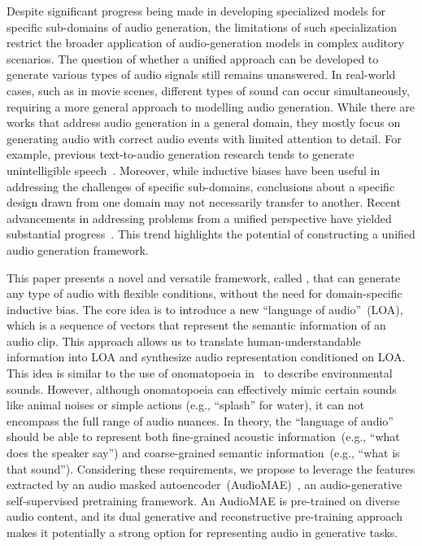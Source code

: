 \documentclass[lettersize,journal]{IEEEtran}
\begin{document}
Despite significant progress being made in developing specialized models for specific sub-domains of audio generation, the limitations of such specialization restrict the broader application of audio-generation models in complex auditory scenarios.
The question of whether a unified approach can be developed to generate various types of audio signals still remains unanswered.
In real-world cases, such as in movie scenes, different types of sound can occur simultaneously, requiring a more general approach to modelling audio generation. 
While there are works that address audio generation in a general domain, they mostly focus on generating  audio with correct audio events with limited attention to detail. For example, previous text-to-audio generation research tends to generate unintelligible speech~\cite{yang2022diffsound,liu2023audioldm,huang2023make-an-audio}.
Moreover, while inductive biases have been useful in addressing the challenges of specific sub-domains, conclusions about a specific design drawn from one domain may not necessarily transfer to another. 
Recent advancements in addressing problems from a unified perspective have yielded substantial progress~\cite{liu2021voicefixer, baevski2022data2vec, girdhar2023imagebind, kong2023universal}. This trend highlights the potential of constructing a unified audio generation framework.

This paper presents a novel and versatile framework, called \vModelName, that can generate any type of audio with flexible conditions, without the need for domain-specific inductive bias. The core idea is to introduce a new ``language of audio''~(LOA), which is a sequence of vectors that represent the semantic information of an audio clip. 
This approach allows us to translate human-understandable information into LOA and synthesize audio representation conditioned on LOA. This idea is similar to the use of onomatopoeia in~\cite{okamoto2022onoma} to describe environmental sounds. However, although onomatopoeia can effectively mimic certain sounds like animal noises or simple actions (e.g., ``splash'' for water), it can not encompass the full range of audio nuances. 
In theory, the ``language of audio'' should be able to represent both fine-grained acoustic information~(e.g., ``what does the speaker say'') and coarse-grained semantic information~(e.g., ``what is that sound''). Considering these requirements, we propose to leverage the features extracted by an audio masked autoencoder~(AudioMAE)~\cite{xu2022masked}, an audio-generative self-supervised pretraining framework. An AudioMAE is pre-trained on diverse audio content, and its dual generative and reconstructive pre-training approach makes it potentially a strong option for representing audio in generative tasks.
\end{document}
